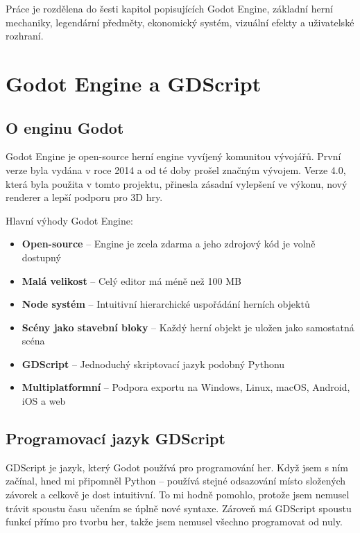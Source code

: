 \documentclass[12pt, a4paper,
oneside
]{report}
\begin{document}
	Práce je rozdělena do šesti kapitol popisujících Godot Engine, základní herní mechaniky, legendární předměty, ekonomický systém, vizuální efekty a uživatelské rozhraní.

	\chapter{Godot Engine a GDScript}
	\pagestyle{fancy}
	\nopagebreak
	
	\section{O enginu Godot}
	\nopagebreak
	
	Godot Engine je open-source herní engine vyvíjený komunitou vývojářů. První verze byla vydána v roce 2014 a od té doby prošel značným vývojem. Verze 4.0, která byla použita v tomto projektu, přinesla zásadní vylepšení ve výkonu, nový renderer a lepší podporu pro 3D hry.
	
	Hlavní výhody Godot Engine:
	\begin{itemize}
		\item \textbf{Open-source} -- Engine je zcela zdarma a jeho zdrojový kód je volně dostupný
		\item \textbf{Malá velikost} -- Celý editor má méně než 100 MB
		\item \textbf{Node systém} -- Intuitivní hierarchické uspořádání herních objektů
		\item \textbf{Scény jako stavební bloky} -- Každý herní objekt je uložen jako samostatná scéna
		\item \textbf{GDScript} -- Jednoduchý skriptovací jazyk podobný Pythonu
		\item \textbf{Multiplatformní} -- Podpora exportu na Windows, Linux, macOS, Android, iOS a web
	\end{itemize}
	
	\section{Programovací jazyk GDScript}
	\nopagebreak
	
	GDScript je jazyk, který Godot používá pro programování her. Když jsem s ním začínal, hned mi připomněl Python -- používá stejné odsazování místo složených závorek a celkově je dost intuitivní. To mi hodně pomohlo, protože jsem nemusel trávit spoustu času učením se úplně nové syntaxe. Zároveň má GDScript spoustu funkcí přímo pro tvorbu her, takže jsem nemusel všechno programovat od nuly.
	\nopagebreak
	
\end{document}

